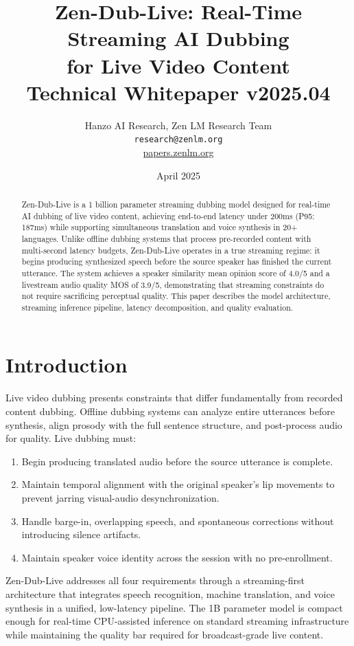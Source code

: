 \documentclass[11pt,a4paper]{article}
\title{\textbf{Zen-Dub-Live: Real-Time Streaming AI Dubbing\\
for Live Video Content}\\[0.5em]
\large Technical Whitepaper v2025.04}
\author{Hanzo AI Research, Zen LM Research Team\\
\texttt{research@zenlm.org}\\
\href{https://papers.zenlm.org}{papers.zenlm.org}}
\date{April 2025}
\begin{document}
\maketitle

\begin{abstract}
Zen-Dub-Live is a 1 billion parameter streaming dubbing model designed for real-time AI dubbing of live video content, achieving end-to-end latency under 200ms (P95: 187ms) while supporting simultaneous translation and voice synthesis in 20+ languages. Unlike offline dubbing systems that process pre-recorded content with multi-second latency budgets, Zen-Dub-Live operates in a true streaming regime: it begins producing synthesized speech before the source speaker has finished the current utterance. The system achieves a speaker similarity mean opinion score of 4.0/5 and a livestream audio quality MOS of 3.9/5, demonstrating that streaming constraints do not require sacrificing perceptual quality. This paper describes the model architecture, streaming inference pipeline, latency decomposition, and quality evaluation.
\end{abstract}

\tableofcontents
\newpage

\section{Introduction}

Live video dubbing presents constraints that differ fundamentally from recorded content dubbing. Offline dubbing systems can analyze entire utterances before synthesis, align prosody with the full sentence structure, and post-process audio for quality. Live dubbing must:

\begin{enumerate}
  \item Begin producing translated audio before the source utterance is complete.
  \item Maintain temporal alignment with the original speaker's lip movements to prevent jarring visual-audio desynchronization.
  \item Handle barge-in, overlapping speech, and spontaneous corrections without introducing silence artifacts.
  \item Maintain speaker voice identity across the session with no pre-enrollment.
\end{enumerate}

Zen-Dub-Live addresses all four requirements through a streaming-first architecture that integrates speech recognition, machine translation, and voice synthesis in a unified, low-latency pipeline. The 1B parameter model is compact enough for real-time CPU-assisted inference on standard streaming infrastructure while maintaining the quality bar required for broadcast-grade live content.
\end{document}
